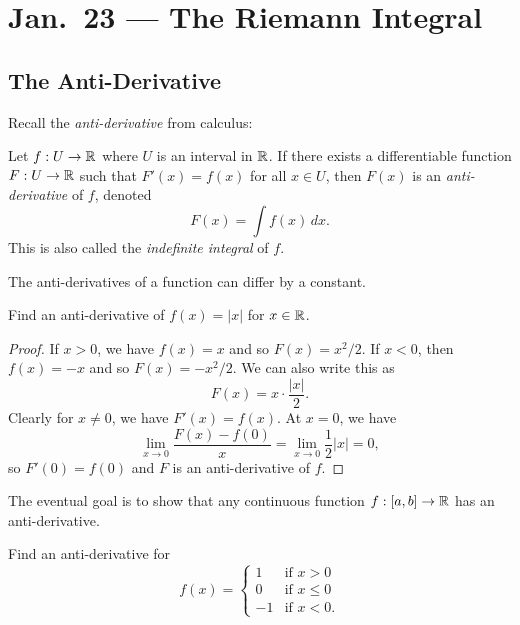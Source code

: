 \chapter{Jan.~23 --- The Riemann Integral}

\section{The Anti-Derivative}

Recall the \emph{anti-derivative} from calculus:

\begin{definition}
  Let $f : U \to \mathbb{R}$ where $U$ is an interval in $\mathbb{R}$.
  If there exists a differentiable function $F : U \to \mathbb{R}$
  such that $F'(x) = f(x)$ for all $x \in U$, then
  $F(x)$ is an \emph{anti-derivative} of $f$, denoted
  \[F(x) = \int f(x)\, dx.\]
  This is also called the \emph{indefinite integral} of
  $f$.
\end{definition}

\begin{remark}
  The anti-derivatives of a function can differ by a
  constant.
\end{remark}

\begin{example}
  Find an anti-derivative of $f(x) = |x|$ for $x \in \mathbb{R}$.
\end{example}

\begin{proof}
  If $x > 0$, we have $f(x) = x$ and so
  $F(x) = x^2 / 2$. If $x < 0$, then $f(x) = -x$
  and so $F(x) = -x^2 / 2$. We can also write this as
  \[
    F(x) = x \cdot \frac{|x|}{2}.
  \]
  Clearly for $x \ne 0$, we have $F'(x) = f(x)$. At
  $x = 0$, we have
  \[
    \lim_{x \to 0} \frac{F(x) - f(0)}{x} = \lim_{x \to 0}
    \frac{1}{2} |x| = 0,
  \]
  so $F'(0) = f(0)$ and $F$ is an anti-derivative of $f$.
\end{proof}

\begin{remark}
  The eventual goal is to show that any continuous
  function $f : [a, b] \to \mathbb{R}$ has an anti-derivative.
\end{remark}

\begin{example}
  Find an anti-derivative for
  \[
    f(x) =
    \begin{cases}
      1 & \text{if } x > 0\\
      0 & \text{if } x \le 0 \\
      -1 & \text{if } x < 0.
    \end{cases}
  \]
\end{example}

